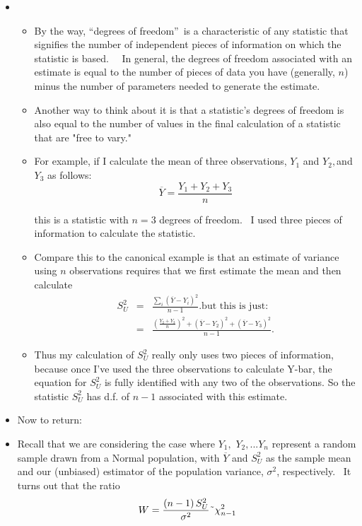 \documentclass[11pt]{article}
\begin{document}
\begin{itemize}
\item 
\begin{itemize}
\item By the way, \textquotedblleft degrees of freedom\textquotedblright\ is
a characteristic of any statistic that signifies the number of independent
pieces of information on which the statistic is based. \ \ In general, the
degrees of freedom associated with an estimate is equal to the number of
pieces of data you have (generally, $n$) minus the number of parameters
needed to generate the estimate. \ \ 

\item Another way to think about it is that a statistic's degrees of freedom
is also equal to the number of values in the final calculation of a
statistic that are "free to vary."

\item For example, if I calculate the mean of three observations, $Y_{1}$
and $Y_{2},$and $Y_{3}$ as follows:%
\begin{equation*}
\overline{Y}=\frac{Y_{1}+Y_{2}+Y_{3}}{n}
\end{equation*}

this is a statistic with $n=3$ degrees of freedom. \ I used three pieces of
information to calculate the statistic.

\item Compare this to the canonical example is that an estimate of variance
using $n$ observations requires that we first estimate the mean and then
calculate%
\begin{eqnarray*}
S_{U}^{2} &=&\frac{\sum_{i}\left( \overline{Y}-Y_{i}\right) ^{2}}{n-1}.\text{
\ but this is just:} \\
&=&\frac{\left( \frac{Y_{2}+Y_{3}}{n}\right) ^{2}+\left( \overline{Y}%
-Y_{2}\right) ^{2}+\left( \overline{Y}-Y_{3}\right) ^{2}}{n-1}.
\end{eqnarray*}

\item Thus my calculation of $S_{U}^{2}$ really only uses two pieces of
information, because once I've used the three observations to calculate
Y-bar, the equation for $S_{U}^{2}$ is fully identified with any two of the
observations. So the statistic $S_{U}^{2}$ has d.f. of $n-1$ associated with
this estimate. \ 
\end{itemize}

\item Now to return:

\item Recall that we are considering the case where $Y_{1},$ $Y_{2},...Y_{n}$
represent a random sample drawn from a Normal population, with $\overline{Y}$
and $S_{U}^{2}$ as the sample mean and our (unbiased) estimator of the
population variance, $\sigma ^{2}$, respectively. \ It turns out that the
ratio%
\begin{equation*}
W=\frac{\left( n-1\right) S_{U}^{2}}{\sigma ^{2}}\symbol{126}\chi _{n-1}^{2}
\end{equation*}


\end{itemize}
\end{document}
